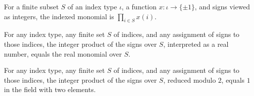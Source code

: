 \begin{definition}
\label{FABL.indexedMonomialInt}
\leanok
{}
For a finite subset $S$ of an index type $\iota$, a function $x\colon\iota\to\{\pm1\}$,
and signs viewed as integers, the indexed monomial is $\prod_{i\in S}x(i)$.
\end{definition}

\begin{theorem}
\label{FABL.indexedMonomialInt_cast}
\leanok
{}
For any index type, any finite set $S$ of indices, and any assignment of signs to those
indices, the integer product of the signs over $S$, interpreted as a real number, equals
the real monomial over $S$.
\end{theorem}

\begin{theorem}
\leanok
{}
For any index type, any finite set $S$ of indices, and any assignment of signs to those
indices, the integer product of the signs over $S$, reduced modulo $2$, equals $1$ in
the field with two elements.
\end{theorem}

